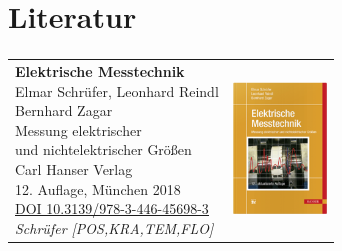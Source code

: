 \section{Literatur}
\begin{frame}
    \frametitle{\insertsection}
    \vfill
    \begin{tabular}{m{}m{}}
        \parbox{0.7\textwidth}{\textbf{Elektrische Messtechnik}\\Elmar Schrüfer, Leonhard Reindl\\Bernhard Zagar\\Messung elektrischer\\und nichtelektrischer Größen\\Carl Hanser Verlag\\12. Auflage, München 2018\\
        \href{https://www.hanser-kundencenter.de/fachbuch/artikel/9783446456549}{\underline{DOI 10.3139/978-3-446-45698-3}}\\
         \emph{Schrüfer [POS,KRA,TEM,FLO]}} &\includegraphics[height=3.5cm]{fig/elektrische_messtechnik}\\
    \end{tabular}

    \vfill

\end{frame}